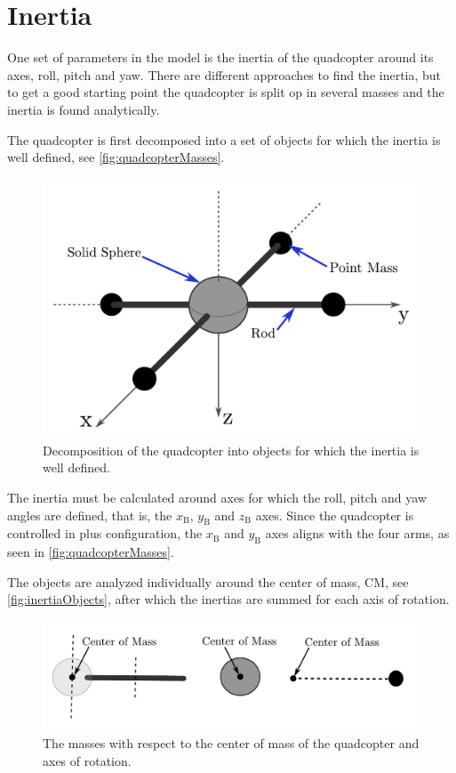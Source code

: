 \chapter{Inertia}\label{app:Inertia}
One set of parameters in the model is the inertia of the quadcopter around its axes, roll, pitch and yaw. There are different approaches to find the inertia, but to get a good starting point the quadcopter is split op in several masses and the inertia is found analytically.

The quadcopter is first decomposed into a set of objects for which the inertia is well defined, see \autoref{fig:quadcopterMasses}.

\begin{figure}[H]
  \centering
  \includegraphics[width=.6\linewidth]{figures/quadcopterMasses}
  \caption{Decomposition of the quadcopter into objects for which the inertia is well defined.}
  \label{fig:quadcopterMasses}
\end{figure}

The inertia must be calculated around axes for which the roll, pitch and yaw angles are defined, that is, the $x_\mathrm{B}$, $y_\mathrm{B}$ and $z_\mathrm{B}$ axes. Since the quadcopter is controlled in plus configuration, the $x_\mathrm{B}$ and $y_\mathrm{B}$ axes aligns with the four arms, as seen in \autoref{fig:quadcopterMasses}.

The objects are analyzed individually around the center of mass, CM, see \autoref{fig:inertiaObjects}, after which the inertias are summed for each axis of rotation.

\begin{figure}[H]
  \centering
  \includegraphics[width=.9\linewidth]{figures/inertiaObjects}
  \caption{The masses with respect to the center of mass of the quadcopter and axes of rotation.}
  \label{fig:inertiaObjects}
\end{figure}

